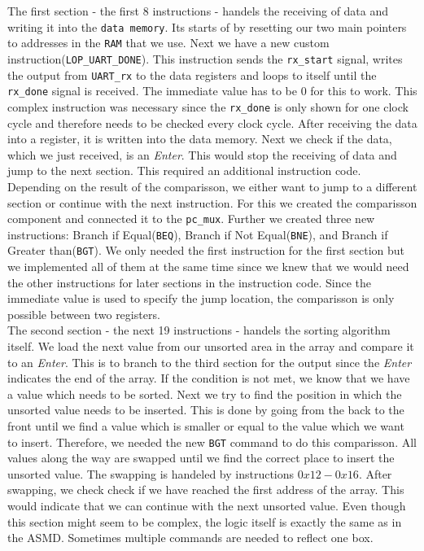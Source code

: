 \documentclass[conference]{IEEEtran}
\begin{document}
The first section - the first 8 instructions - handels the receiving of data and writing it into the \texttt{data memory}. Its starts of by resetting our two main pointers to addresses in the \texttt{RAM} that we use. Next we have a new custom instruction(\texttt{LOP\_UART\_DONE}). This instruction sends the \texttt{rx\_start} signal, writes the output from \texttt{UART\_rx} to the data registers and loops to itself until the \texttt{rx\_done} signal is received. The immediate value has to be 0 for this to work. This complex instruction was necessary since the \texttt{rx\_done} is only shown for one clock cycle and therefore needs to be checked every clock cycle. After receiving the data into a register, it is written into the data memory. Next we check if the data, which we just received, is an \textit{Enter}. This would stop the receiving of data and jump to the next section. This required an additional instruction code. Depending on the result of the comparisson, we either want to jump to a different section or continue with the next instruction. For this we created the comparisson component and connected it to the \texttt{pc\_mux}. Further we created three new instructions: Branch if Equal(\texttt{BEQ}), Branch if Not Equal(\texttt{BNE}), and Branch if Greater than(\texttt{BGT}). We only needed the first instruction for the first section but we implemented all of them at the same time since we knew that we would need the other instructions for later sections in the instruction code. Since the immediate value is used to specify the jump location, the comparisson is only possible between two registers.\\
The second section - the next 19 instructions - handels the sorting algorithm itself. We load the next value from our unsorted area in the array and compare it to an \textit{Enter}. This is to branch to the third section for the output since the \textit{Enter} indicates the end of the array. If the condition is not met, we know that we have a value which needs to be sorted. Next we try to find the position in which the unsorted value needs to be inserted. This is done by going from the back to the front until we find a value which is smaller or equal to the value which we want to insert. Therefore, we needed the new \texttt{BGT} command to do this comparisson. All values along the way are swapped until we find the correct place to insert the unsorted value. The swapping is handeled by instructions $0x12-0x16$. After swapping, we check check if we have reached the first address of the array. This would indicate that we can continue with the next unsorted value. Even though this section might seem to be complex, the logic itself is exactly the same as in the ASMD. Sometimes multiple commands are needed to reflect one box.\\
\end{document}
